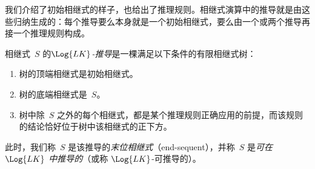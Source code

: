 \documentclass[../../../include/open-logic-section]{subfiles}
\begin{document}
      {}
      {}



\begin{explain}
我们介绍了初始相继式的样子，也给出了推理规则。相继式演算中的推导就是由这些归纳生成的：每个推导要么本身就是一个初始相继式，要么由一个或两个推导再接一个推理规则构成。
\end{explain}

\begin{defn}[$\Log{LK}$ 推导]
相继式~$S$ 的\emph{$\Log{LK}$-推导}是一棵满足以下条件的有限相继式树：
\begin{enumerate}
\item 树的顶端相继式是初始相继式。
\item 树的底端相继式是~$S$。
\item 树中除~$S$ 之外的每个相继式，都是某个推理规则正确应用的前提，而该规则的结论恰好位于树中该相继式的正下方。
\end{enumerate}
此时，我们称~$S$ 是该推导的\emph{末位相继式}（end-sequent），并称~$S$ 是\emph{可在 $\Log{LK}$ 中推导的}（或称 $\Log{LK}$-可推导的）。
\end{defn}
\end{document}
